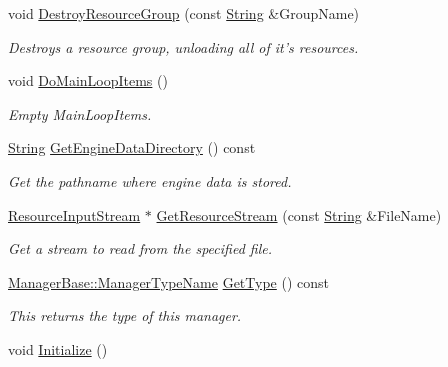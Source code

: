 \begin{DoxyCompactItemize}
void \hyperlink{classMezzanine_1_1ResourceManager_aa827efdad18698b7d7319dab35864bbe}{DestroyResourceGroup} (const \hyperlink{namespaceMezzanine_acf9fcc130e6ebf08e3d8491aebcf1c86}{String} \&GroupName)
\begin{DoxyCompactList}\small\item\em Destroys a resource group, unloading all of it's resources. \item\end{DoxyCompactList}\item 
void \hyperlink{classMezzanine_1_1ResourceManager_a57b72306ed2bfaa198ff47d43c4013fa}{DoMainLoopItems} ()
\begin{DoxyCompactList}\small\item\em Empty MainLoopItems. \item\end{DoxyCompactList}\item 
\hyperlink{namespaceMezzanine_acf9fcc130e6ebf08e3d8491aebcf1c86}{String} \hyperlink{classMezzanine_1_1ResourceManager_a5b2bd318749c5d6e236680410c13f8bc}{GetEngineDataDirectory} () const 
\begin{DoxyCompactList}\small\item\em Get the pathname where engine data is stored. \item\end{DoxyCompactList}\item 
\hyperlink{classMezzanine_1_1ResourceInputStream}{ResourceInputStream} $\ast$ \hyperlink{classMezzanine_1_1ResourceManager_a5d6f86f351c9ea275436f31cc792b02b}{GetResourceStream} (const \hyperlink{namespaceMezzanine_acf9fcc130e6ebf08e3d8491aebcf1c86}{String} \&FileName)
\begin{DoxyCompactList}\small\item\em Get a stream to read from the specified file. \item\end{DoxyCompactList}\item 
\hyperlink{classMezzanine_1_1ManagerBase_a08cecf5169cad3e82be81a3a159b0b6e}{ManagerBase::ManagerTypeName} \hyperlink{classMezzanine_1_1ResourceManager_aafe55f1095a67f30e97bff25200685d7}{GetType} () const 
\begin{DoxyCompactList}\small\item\em This returns the type of this manager. \item\end{DoxyCompactList}\item 
void \hyperlink{classMezzanine_1_1ResourceManager_a4b4e77984e21e3eaa1c47772d2e9c6f4}{Initialize} ()

\end{DoxyCompactItemize}
